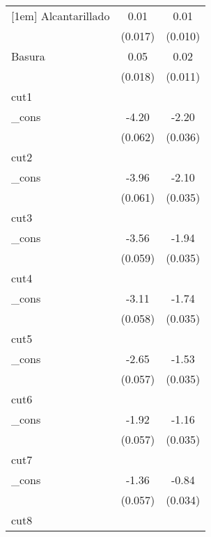 {\begin{tabular}{l*{2}{c}}
[1em]
Alcantarillado&        0.01         &        0.01         \\
            &     (0.017)         &     (0.010)         \\
[1em]
Basura      &        0.05\sym{**} &        0.02         \\
            &     (0.018)         &     (0.011)         \\
\hline
cut1        &                     &                     \\
\_cons      &       -4.20\sym{***}&       -2.20\sym{***}\\
            &     (0.062)         &     (0.036)         \\
\hline
cut2        &                     &                     \\
\_cons      &       -3.96\sym{***}&       -2.10\sym{***}\\
            &     (0.061)         &     (0.035)         \\
\hline
cut3        &                     &                     \\
\_cons      &       -3.56\sym{***}&       -1.94\sym{***}\\
            &     (0.059)         &     (0.035)         \\
\hline
cut4        &                     &                     \\
\_cons      &       -3.11\sym{***}&       -1.74\sym{***}\\
            &     (0.058)         &     (0.035)         \\
\hline
cut5        &                     &                     \\
\_cons      &       -2.65\sym{***}&       -1.53\sym{***}\\
            &     (0.057)         &     (0.035)         \\
\hline
cut6        &                     &                     \\
\_cons      &       -1.92\sym{***}&       -1.16\sym{***}\\
            &     (0.057)         &     (0.035)         \\
\hline
cut7        &                     &                     \\
\_cons      &       -1.36\sym{***}&       -0.84\sym{***}\\
            &     (0.057)         &     (0.034)         \\
\hline
cut8        &                     &                     \\

\end{tabular}}

